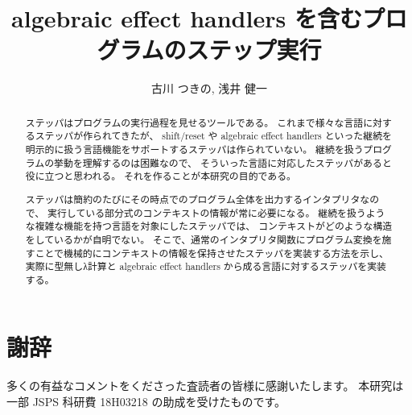 \documentclass[japanese,draft]{jssst_ppl} %
\title{algebraic effect handlers を含むプログラムのステップ実行}
\author{古川 つきの, 浅井 健一}
\begin{document}
\maketitle
\begin{abstract}
  ステッパはプログラムの実行過程を見せるツールである。
  これまで様々な言語に対するステッパが作られてきたが、
  shift/reset や algebraic effect handlers
  といった継続を明示的に扱う言語機能をサポートするステッパは作られていない。
  継続を扱うプログラムの挙動を理解するのは困難なので、
  そういった言語に対応したステッパがあると役に立つと思われる。
  それを作ることが本研究の目的である。

  ステッパは簡約のたびにその時点でのプログラム全体を出力するインタプリタなので、
  実行している部分式のコンテキストの情報が常に必要になる。
  継続を扱うような複雑な機能を持つ言語を対象にしたステッパでは、
  コンテキストがどのような構造をしているかが自明でない。
  そこで、通常のインタプリタ関数にプログラム変換を施すことで機械的にコンテキストの情報を保持させたステッパを実装する方法を示し、
  実際に型無しλ計算と algebraic effect handlers から成る言語に対するステッパを実装する。
\end{abstract}















\section*{謝辞}
多くの有益なコメントをくださった査読者の皆様に感謝いたします。
本研究は一部 JSPS 科研費 18H03218 の助成を受けたものです。





\end{document}
